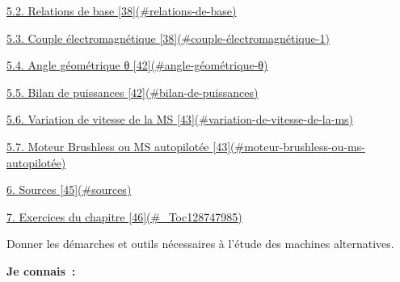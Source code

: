 \protect\hyperlink{relations-de-base}{5.2. Relations de base {[}38{]}(\#relations-de-base)}

\protect\hyperlink{couple-uxe9lectromagnuxe9tique-1}{5.3. Couple électromagnétique {[}38{]}(\#couple-électromagnétique-1)}

\protect\hyperlink{angle-guxe9omuxe9trique-ux3b8}{5.4. Angle géométrique θ {[}42{]}(\#angle-géométrique-θ)}

\protect\hyperlink{bilan-de-puissances}{5.5. Bilan de puissances {[}42{]}(\#bilan-de-puissances)}

\protect\hyperlink{variation-de-vitesse-de-la-ms}{5.6. Variation de vitesse de la MS {[}43{]}(\#variation-de-vitesse-de-la-ms)}

\protect\hyperlink{moteur-brushless-ou-ms-autopilotuxe9e}{5.7. Moteur Brushless ou MS autopilotée {[}43{]}(\#moteur-brushless-ou-ms-autopilotée)}

\protect\hyperlink{sources}{6. Sources {[}45{]}(\#sources)}

\protect\hyperlink{_Toc128747985}{7. Exercices du chapitre {[}46{]}(\#\_Toc128747985)}

Donner les démarches et outils nécessaires à l'étude des machines alternatives.

\textbf{Je connais~:}


